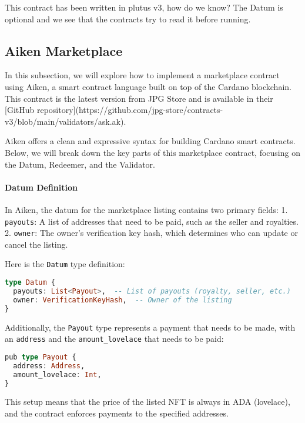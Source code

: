 This contract has been written in plutus v3, how do we know?
The Datum is optional and we see that the contracts try to read it before running.

\subsection{Aiken Marketplace}

In this subsection, we will explore how to implement a marketplace contract using Aiken, a smart contract language built on top of the Cardano blockchain. This contract is the latest version from JPG Store and is available in their [GitHub repository](https://github.com/jpg-store/contracts-v3/blob/main/validators/ask.ak).

Aiken offers a clean and expressive syntax for building Cardano smart contracts. Below, we will break down the key parts of this marketplace contract, focusing on the Datum, Redeemer, and the Validator.

\paragraph{Datum Definition}
In Aiken, the datum for the marketplace listing contains two primary fields:
1. \texttt{payouts}: A list of addresses that need to be paid, such as the seller and royalties.
2. \texttt{owner}: The owner’s verification key hash, which determines who can update or cancel the listing.

Here is the \texttt{Datum} type definition:

\begin{lstlisting}[language=haskell, caption=Datum Definition in Aiken]
type Datum {
  payouts: List<Payout>,  -- List of payouts (royalty, seller, etc.)
  owner: VerificationKeyHash,  -- Owner of the listing
}
\end{lstlisting}

Additionally, the \texttt{Payout} type represents a payment that needs to be made, with an \texttt{address} and the \texttt{amount\_lovelace} that needs to be paid:

\begin{lstlisting}[language=haskell, caption=Payout Definition in Aiken]
pub type Payout {
  address: Address,
  amount_lovelace: Int,
}
\end{lstlisting}

This setup means that the price of the listed NFT is always in ADA (lovelace), and the contract enforces payments to the specified addresses.

